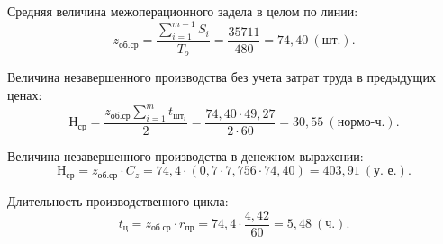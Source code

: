 Средняя величина межоперационного задела в целом по линии:
\begin{equation*}
  z_{\text{об.ср}} = \dfrac{\sum^{m-1}_{i=1} S_i}{T_o} =
  \dfrac{35711}{480} = 74{,}40 \: (\text{шт.}).
\end{equation*}

Величина незавершенного производства без учета затрат труда в предыдущих ценах:
\begin{equation*}
  \text{Н}_{\text{ср}} = \dfrac{z_{\text{об.ср}} \sum^m_{i=1} t_{\text{шт}_i}}{2} =
  \dfrac{74{,}40 \cdot 49{,}27}{2 \cdot 60} = 30{,}55 \: (\text{нормо-ч.}).
\end{equation*}

Величина незавершенного производства в денежном выражении:
\begin{equation*}
  \text{Н}_{\text{ср}} = z_{\text{об.ср}} \cdot C_z = 
  74{,}4 \cdot (0{,}7 \cdot 7{,}756 \cdot 74{,}40) = 403{,}91 \: (\text{у.~е.}).
\end{equation*}

Длительность производственного цикла:
\begin{equation*}
  t_{\text{ц}} = z_{\text{об.ср}} \cdot r_{\text{пр}} = 
  74{,}4 \cdot \dfrac{4{,}42}{60} = 5{,}48 \: (\text{ч.}).
\end{equation*}
